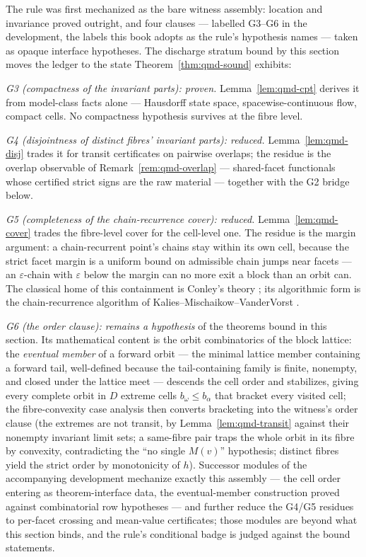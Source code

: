 \begin{bremark}\label{rem:qmd-ledger}
The rule was first mechanized as the bare witness assembly: location
and invariance proved outright, and four clauses --- labelled G3--G6 in
the development, the labels this book adopts as the rule's hypothesis
names --- taken as opaque interface hypotheses. The discharge stratum
bound by this section moves the ledger to the state
Theorem~\ref{thm:qmd-sound} exhibits:

\emph{G3 (compactness of the invariant parts): proven.}
Lemma~\ref{lem:qmd-cpt} derives it from model-class facts alone ---
Hausdorff state space, spacewise-continuous flow, compact cells. No
compactness hypothesis survives at the fibre level.

\emph{G4 (disjointness of distinct fibres' invariant parts): reduced.}
Lemma~\ref{lem:qmd-disj} trades it for transit certificates on
pairwise overlaps; the residue is the overlap observable of
Remark~\ref{rem:qmd-overlap} --- shared-facet functionals whose
certified strict signs are the raw material --- together with the G2
bridge below.

\emph{G5 (completeness of the chain-recurrence cover): reduced.}
Lemma~\ref{lem:qmd-cover} trades the fibre-level cover for the
cell-level one. The residue is the margin argument: a chain-recurrent
point's chains stay within its own cell, because the strict facet
margin is a uniform bound on admissible chain jumps near facets --- an
$\varepsilon$-chain with $\varepsilon$ below the margin can no more
exit a block than an orbit can. The classical home of this
containment is Conley's theory \cite{conley1978}; its algorithmic
form is the chain-recurrence algorithm of
Kalies--Mischaikow--VanderVorst \cite{kmv2005}.

\emph{G6 (the order clause): remains a hypothesis} of the theorems
bound in this section. Its mathematical content is the orbit
combinatorics of the block lattice: the \emph{eventual member} of a
forward orbit --- the minimal lattice member containing a forward
tail, well-defined because the tail-containing family is finite,
nonempty, and closed under the lattice meet --- descends the cell
order and stabilizes, giving every complete orbit in $D$ extreme
cells $b_\omega \leq b_\alpha$ that bracket every visited cell; the
fibre-convexity case analysis then converts bracketing into the
witness's order clause (the extremes are not transit, by
Lemma~\ref{lem:qmd-transit} against their nonempty invariant limit
sets; a same-fibre pair traps the whole orbit in its fibre by
convexity, contradicting the ``no single $M(v)$'' hypothesis; distinct
fibres yield the strict order by monotonicity of $h$). Successor
modules of the accompanying development mechanize exactly this
assembly --- the cell order entering as theorem-interface data, the
eventual-member construction proved against combinatorial row
hypotheses --- and further reduce the G4/G5 residues to per-facet
crossing and mean-value certificates; those modules are beyond what
this section binds, and the rule's conditional badge is judged against
the bound statements.


\end{bremark}
